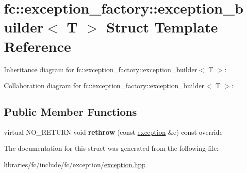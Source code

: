 \hypertarget{structfc_1_1exception__factory_1_1exception__builder}{}\section{fc\+:\+:exception\+\_\+factory\+:\+:exception\+\_\+builder$<$ T $>$ Struct Template Reference}
\label{structfc_1_1exception__factory_1_1exception__builder}


Inheritance diagram for fc\+:\+:exception\+\_\+factory\+:\+:exception\+\_\+builder$<$ T $>$\+:


Collaboration diagram for fc\+:\+:exception\+\_\+factory\+:\+:exception\+\_\+builder$<$ T $>$\+:
\subsection*{Public Member Functions}
\begin{DoxyCompactItemize}
\item 
\mbox{\label{structfc_1_1exception__factory_1_1exception__builder_a2eacba38f769e8b9e20dc7559a956420}} 
virtual N\+O\+\_\+\+R\+E\+T\+U\+RN void {\bfseries rethrow} (const \mbox{\hyperlink{classfc_1_1exception}{exception}} \&e) const override
\end{DoxyCompactItemize}


The documentation for this struct was generated from the following file\+:\begin{DoxyCompactItemize}
\item 
libraries/fc/include/fc/exception/\mbox{\hyperlink{exception_8hpp}{exception.\+hpp}}\end{DoxyCompactItemize}
